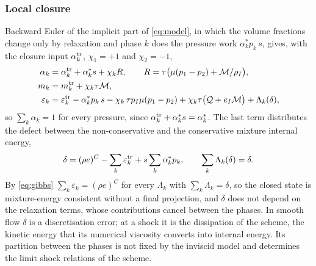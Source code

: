 \documentclass[a4paper,fleqn]{cas-sc}
\begin{document}
\subsubsection{Local closure}
\label{sec:closure}
Backward Euler of the implicit part of \eqref{eq:model}, in which the volume fractions change only by relaxation and
phase $k$ does the pressure work $\alpha^*_kp_k\,s$, gives, with the closure input $\alpha^{\rm tr}_k$, $\chi_1=+1$ and $\chi_2=-1$,
\begin{equation}
\begin{aligned}
\alpha_k&=\alpha^{\rm tr}_k+\alpha^*_ks+\chi_kR,\qquad R=\tau\big(\mu(p_1-p_2)+\mathcal M/\rho_I\big),\\
m_k&=m^{\rm tr}_k+\chi_k\tau\mathcal M,\\
\varepsilon_k&=\varepsilon^{\rm tr}_k-\alpha^*_kp_k\,s-\chi_k\,\tau p_I\mu(p_1-p_2)+\chi_k\tau\big(\mathcal Q+e_I\mathcal M\big)+\Lambda_k(\delta),
\end{aligned}
\label{eq:gibbs}
\end{equation}
so $\sum_k\alpha_k=1$ for every pressure, since $\alpha^{\rm tr}_k+\alpha^*_ks=\alpha^*_k$. The last term distributes the defect between the non-conservative and the
conservative mixture internal energy,
\begin{equation}
\delta=(\rho e)^C-\sum_k\varepsilon^{\rm tr}_k+s\sum_k\alpha^*_kp_k,\qquad \sum_k\Lambda_k(\delta)=\delta .
\label{eq:defect}
\end{equation}
By \eqref{eq:gibbs} $\sum_k\varepsilon_k=(\rho e)^C$ for every $\Lambda_k$ with $\sum_k\Lambda_k=\delta$, so the closed state is
mixture-energy consistent without a final projection, and $\delta$ does not depend on the relaxation terms, whose
contributions cancel between the phases. In smooth flow $\delta$ is a discretisation error; at a shock it is the dissipation
of the scheme, the kinetic energy that its numerical viscosity converts into internal energy. Its partition between the
phases is not fixed by the inviscid model and determines the limit shock relations of the scheme.
\end{document}
